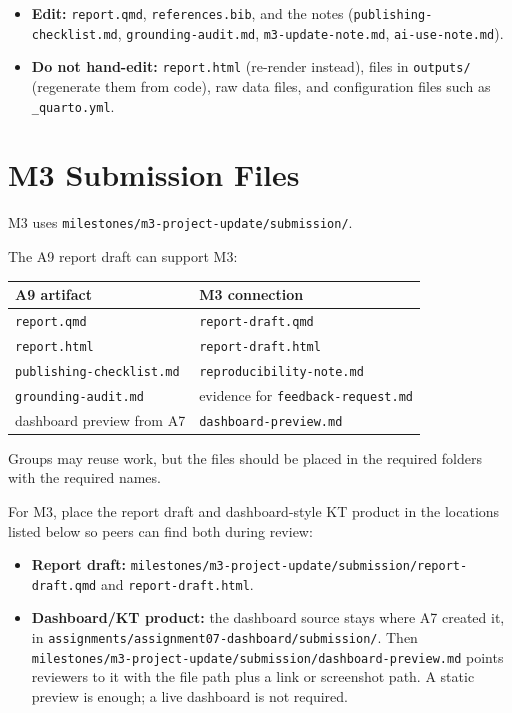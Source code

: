 \documentclass[
  letterpaper,
  DIV=11,
  numbers=noendperiod,
  oneside]{scrreprt}
\providecommand{\tightlist}{%
  \setlength{\itemsep}{0pt}\setlength{\parskip}{0pt}}
\begin{document}
\begin{itemize}
\tightlist
\item
  \textbf{Edit:} \texttt{report.qmd}, \texttt{references.bib}, and the
  notes (\texttt{publishing-checklist.md}, \texttt{grounding-audit.md},
  \texttt{m3-update-note.md}, \texttt{ai-use-note.md}).
\item
  \textbf{Do not hand-edit:} \texttt{report.html} (re-render instead),
  files in \texttt{outputs/} (regenerate them from code), raw data
  files, and configuration files such as \texttt{\_quarto.yml}.
\end{itemize}

\section*{M3 Submission Files}\label{m3-submission-files}


M3 uses \texttt{milestones/m3-project-update/submission/}.

The A9 report draft can support M3:

\begin{longtable}[]{@{}ll@{}}
\toprule\noalign{}
A9 artifact & M3 connection \\
\midrule\noalign{}
\endhead
\bottomrule\noalign{}
\endlastfoot
\texttt{report.qmd} & \texttt{report-draft.qmd} \\
\texttt{report.html} & \texttt{report-draft.html} \\
\texttt{publishing-checklist.md} & \texttt{reproducibility-note.md} \\
\texttt{grounding-audit.md} & evidence for
\texttt{feedback-request.md} \\
dashboard preview from A7 & \texttt{dashboard-preview.md} \\
\end{longtable}

Groups may reuse work, but the files should be placed in the required
folders with the required names.

For M3, place the report draft and dashboard-style KT product in the
locations listed below so peers can find both during review:

\begin{itemize}
\tightlist
\item
  \textbf{Report draft:}
  \texttt{milestones/m3-project-update/submission/report-draft.qmd} and
  \texttt{report-draft.html}.
\item
  \textbf{Dashboard/KT product:} the dashboard source stays where A7
  created it, in
  \texttt{assignments/assignment07-dashboard/submission/}. Then
  \texttt{milestones/m3-project-update/submission/dashboard-preview.md}
  points reviewers to it with the file path plus a link or screenshot
  path. A static preview is enough; a live dashboard is not required.
\end{itemize}
\end{document}
